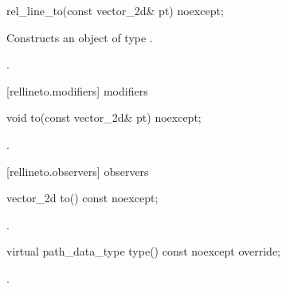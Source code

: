 \begin{itemdecl}
    rel_line_to(const vector_2d& pt) noexcept;
\end{itemdecl}
\begin{itemdescr}
	\pnum
	\effects
	Constructs an object of type .
	
	\pnum
	\postconditions
	.
\end{itemdescr}

 [rellineto.modifiers]{ modifiers}

\begin{itemdecl}
    void to(const vector_2d& pt) noexcept;
\end{itemdecl}
\begin{itemdescr}
	\pnum
	\postconditions
	.
	
\end{itemdescr}

 [rellineto.observers]{ observers}

\begin{itemdecl}
    vector_2d to() const noexcept;
\end{itemdecl}
\begin{itemdescr}
	\pnum
	\returns
	.

\end{itemdescr}

\begin{itemdecl}
    virtual path_data_type type() const noexcept override;
\end{itemdecl}
\begin{itemdescr}
	\pnum
	\returns
	.

\end{itemdescr}
